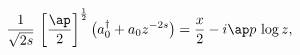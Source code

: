 \begin{equation}
\frac{1}{\sqrt{2s}}\,\left[\frac{\ap}{2}\right]^{\frac12}\bigl(
a_0^{\dag}+a_0z^{-2s}
\bigr)=\frac{x}{2}-i\ap p\,\log z,
\label{aaxp}
\end{equation}

